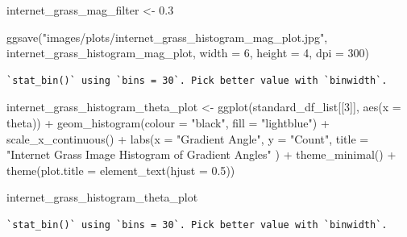 \documentclass[
  letterpaper,
  DIV=11,
  numbers=noendperiod]{scrreprt}
\newenvironment{Shaded}{\begin{snugshade}}{\end{snugshade}}
\newcommand{\AttributeTok}[1]{\textcolor[rgb]{0.40,0.45,0.13}{#1}}
\newcommand{\DecValTok}[1]{\textcolor[rgb]{0.68,0.00,0.00}{#1}}
\newcommand{\FloatTok}[1]{\textcolor[rgb]{0.68,0.00,0.00}{#1}}
\newcommand{\FunctionTok}[1]{\textcolor[rgb]{0.28,0.35,0.67}{#1}}
\newcommand{\NormalTok}[1]{\textcolor[rgb]{0.00,0.23,0.31}{#1}}
\newcommand{\OtherTok}[1]{\textcolor[rgb]{0.00,0.23,0.31}{#1}}
\newcommand{\SpecialCharTok}[1]{\textcolor[rgb]{0.37,0.37,0.37}{#1}}
\newcommand{\StringTok}[1]{\textcolor[rgb]{0.13,0.47,0.30}{#1}}
\begin{document}
\begin{Shaded}
\begin{Highlighting}[]
\NormalTok{internet\_grass\_mag\_filter }\OtherTok{\textless{}{-}} \FloatTok{0.3}

\FunctionTok{ggsave}\NormalTok{(}\StringTok{"images/plots/internet\_grass\_histogram\_mag\_plot.jpg"}\NormalTok{, internet\_grass\_histogram\_mag\_plot, }\AttributeTok{width =} \DecValTok{6}\NormalTok{, }\AttributeTok{height =} \DecValTok{4}\NormalTok{, }\AttributeTok{dpi =} \DecValTok{300}\NormalTok{)}
\end{Highlighting}
\end{Shaded}

\begin{verbatim}
`stat_bin()` using `bins = 30`. Pick better value with `binwidth`.
\end{verbatim}

\begin{Shaded}
\begin{Highlighting}[]
\NormalTok{internet\_grass\_histogram\_theta\_plot }\OtherTok{\textless{}{-}}
  \FunctionTok{ggplot}\NormalTok{(standard\_df\_list[[}\DecValTok{3}\NormalTok{]], }\FunctionTok{aes}\NormalTok{(}\AttributeTok{x =}\NormalTok{ theta)) }\SpecialCharTok{+}
  \FunctionTok{geom\_histogram}\NormalTok{(}\AttributeTok{colour =} \StringTok{"black"}\NormalTok{, }\AttributeTok{fill =} \StringTok{"lightblue"}\NormalTok{) }\SpecialCharTok{+}
  \FunctionTok{scale\_x\_continuous}\NormalTok{() }\SpecialCharTok{+} 
  \FunctionTok{labs}\NormalTok{(}\AttributeTok{x =} \StringTok{"Gradient Angle"}\NormalTok{, }
       \AttributeTok{y =} \StringTok{"Count"}\NormalTok{, }
       \AttributeTok{title =} \StringTok{"Internet Grass Image Histogram of Gradient Angles"}
\NormalTok{       ) }\SpecialCharTok{+}
  \FunctionTok{theme\_minimal}\NormalTok{() }\SpecialCharTok{+}
  \FunctionTok{theme}\NormalTok{(}\AttributeTok{plot.title =} \FunctionTok{element\_text}\NormalTok{(}\AttributeTok{hjust =} \FloatTok{0.5}\NormalTok{))}

\NormalTok{internet\_grass\_histogram\_theta\_plot}
\end{Highlighting}
\end{Shaded}

\begin{verbatim}
`stat_bin()` using `bins = 30`. Pick better value with `binwidth`.
\end{verbatim}
\end{document}
